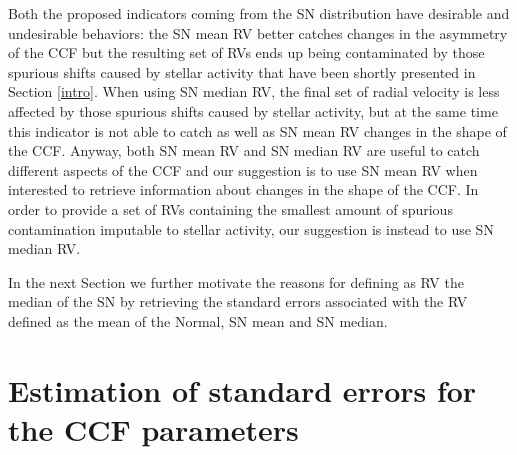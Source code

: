 \documentclass[11pt, oneside]{article}
\begin{document}
Both the proposed indicators coming from the SN distribution have desirable and undesirable behaviors: the SN mean RV better catches changes in the asymmetry of the CCF but the resulting set of RVs ends up being contaminated by those spurious shifts caused by stellar activity that have been shortly presented in Section \ref{intro}. When using SN median RV, the final set of radial velocity is less affected by those spurious shifts caused by stellar activity, but at the same time this indicator is not able to catch as well as SN mean RV changes in the shape of the CCF. Anyway, both SN mean RV and SN median RV are useful to catch different aspects of the CCF and our suggestion is to use SN mean RV when interested to retrieve information about changes in the shape of the CCF. In order to provide a set of RVs containing the smallest amount of spurious contamination imputable to stellar activity, our suggestion is instead to use SN median RV. 

In the next Section we further motivate the reasons for defining as RV the median of the SN by retrieving the standard errors associated with the RV defined as the mean of the Normal, SN mean and SN median.

\section{Estimation of standard errors for the CCF parameters} \label{sec:5}

\end{document}
